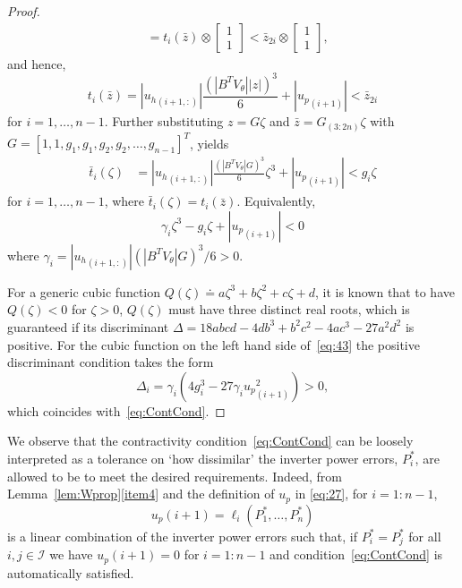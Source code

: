\documentclass[letter, 10pt, conference]{ieeeconf}
\newcommand{\I}{\mathcal{I}}
\newcommand{\1}{\mathbf{1}}
\newcommand{\0}{\mathbf{0}}
\begin{document}
{\begin{proof}
\begin{align*}
	&= t_i(\bar{z}) \otimes 
	\left[\begin{smallmatrix} 1 \\ 1 \end{smallmatrix}\right]
	<
	\bar{z}_{2i} \otimes 
	\left[\begin{smallmatrix} 1 \\ 1 \end{smallmatrix}\right],
  \end{align*}
  and hence,
  \begin{equation}
	\label{eq:40}
	t_i(\bar{z}) 
	= |{u_h}_{(i+1,:)}| \frac{(|B^T V_\theta||z|)^3}{6} + |{u_p}_{(i+1)}| 
	< \bar{z}_{2i}
  \end{equation}
  for $i=1,\dots,n-1$.
Further substituting $z= G\zeta$ and $\bar{z} =  G_{(3:2n)} \zeta
  $ with $G = [1,1,g_1,g_1,g_2,g_2,\dots,g_{n-1}]^T$, yields
  \begin{align}
\label{eq:41}
        \bar{t}_i(\zeta) &=|{u_h}_{(i+1,:)}| \frac{(|B^T V_\theta|G)^3}{6}
        \zeta^3 + |{u_p}_{(i+1)}| < g_i \zeta
  \end{align}
  for $i=1,\dots,n-1$, where $\bar{t}_i(\zeta)
  =t_i(\bar{z})$. Equivalently,
  \begin{equation}
	\label{eq:43}
        \gamma_i \zeta^3 - g_i \zeta + |{u_p}_{(i+1)}| < 0
  \end{equation}
  where $\gamma_i=|{u_h}_{(i+1,:)}|(|B^T V_\theta|G)^3/6 >0$. 

  For a generic cubic function $Q(\zeta) \doteq
  a\zeta^3+b\zeta^2+c\zeta+d$, it is known that to have $Q(\zeta)<0$
  for $\zeta>0$, $Q(\zeta)$ must have three distinct real roots, which
  is guaranteed if its discriminant
  $\Delta=18abcd-4db^3+b^2c^2-4ac^3-27a^2d^2$ is positive.  For the
  cubic function on the left hand side of~\eqref{eq:43} the positive
  discriminant condition takes the form
  \begin{equation*}
    \Delta_i = \gamma_i (4  g_i^3-27 \gamma_i {u_p}_{(i+1)}^2) > 0,
  \end{equation*}
  which coincides with~\eqref{eq:ContCond}. 
\end{proof}

We observe that the contractivity condition~\eqref{eq:ContCond} can be
loosely interpreted as a tolerance on `how dissimilar' 
the inverter power errors, $P_i^*$,
are allowed to be to meet the desired
requirements. Indeed, from Lemma~\ref{lem:Wprop}\eqref{item4} and the
definition of $u_p$ in \eqref{eq:27}, for $i=1:n-1$, 
\begin{equation}
  \label{eq:3}
  u_p(i+1) =\ell_{i}(P_1^*, \dots, P_n^*)
\end{equation}
is a linear combination of the inverter power errors
such that, if
$P_i^*=P_j^*$ for all $i,j\in\I$ we have $u_p(i+1)=0$ for $i=1:n-1$
and condition~\eqref{eq:ContCond} is automatically satisfied.



}
\end{document}
